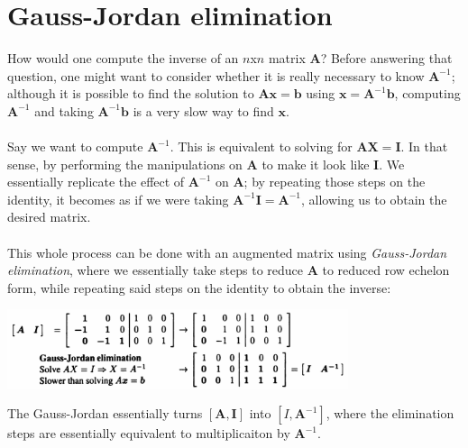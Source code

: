 \documentclass{report}
\begin{document}
\section{Gauss-Jordan elimination}
How would one compute the inverse of an $n$x$n$ matrix $\bm A$? Before answering that question, one might want to consider whether it is really necessary to know
$\bm A^{-1}$; although it is possible to find the solution to $\bm{Ax}=\bm b$ using $\bm x=\bm A^{-1}\bm{b}$, computing $\bm A^{-1}$ and taking $\bm A^{-1}\bm b$ is
a very slow way to find $\bm x$.\\
\vspace{1mm}\\
Say we want to compute $\bm A^{-1}$. This is equivalent to solving for $\bm{AX}=\bm I$. In that sense, by performing the manipulations on $\bm A$ to make it look
like $\bm I$. We essentially replicate the effect of $\bm A^{-1}$ on $\bm A$; by repeating those steps on the identity, 
it becomes as if we were taking $\bm A^{-1}\bm I=\bm A^{-1}$, allowing us to obtain the desired matrix.\\
\vspace{1mm}\\
This whole process can be done with an augmented matrix using \textit{Gauss-Jordan elimination}, where we essentially take steps to reduce $\bm A$ to reduced row
echelon form, while repeating said steps on the identity to obtain the inverse:
\begin{center}
\includegraphics[width=10cm]{7}
\end{center}
The Gauss-Jordan essentially turns $[\bm A,\bm I]$ into $[I,\bm A^{-1}]$, where the elimination steps are essentially equivalent to multiplicaiton by $\bm A^{-1}$.
\newpage
\end{document}
